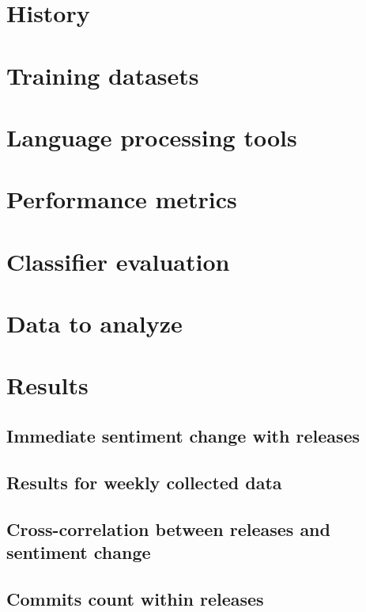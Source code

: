 \section{History}


\section{Training datasets} \label{sec:trainingDatasets}


\section{Language processing tools} \label{sec:languageProcessingTools}


\section{Performance metrics}


\section{Classifier evaluation}
\label{sec:classifierEvaluation}


\section{Data to analyze}


\section{Results}
\subsection{Immediate sentiment change with releases}

\subsection{Results for weekly collected data}


\subsection{Cross-correlation between releases and sentiment change} \label{ssec:crossCorrelation}


\subsection{Commits count within releases} \label{ssec:crossCorrelationCommits}
 
